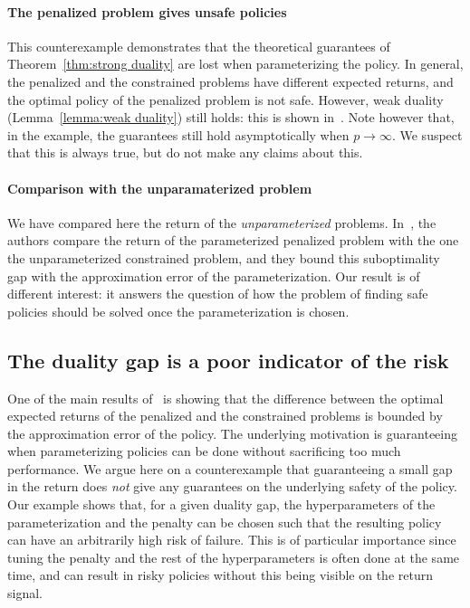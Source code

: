 \paragraph{The penalized problem gives unsafe policies} This counterexample demonstrates that the theoretical guarantees of Theorem~\ref{thm:strong duality} are lost when parameterizing the policy. In general, the penalized and the constrained problems have different expected returns, and the optimal policy of the penalized problem is not safe. However, weak duality (Lemma~\ref{lemma:weak duality}) still holds: this is shown in~\cite{paternain2019safe}. Note however that, in the example, the guarantees still hold asymptotically when $p\to\infty$. We suspect that this is always true, but do not make any claims about this.

\paragraph{Comparison with the unparamaterized problem} We have compared here the return of the\emph{ unparameterized} problems. In~\cite{paternain2019safe}, the authors compare the return of the parameterized penalized problem with the one the unparameterized constrained problem, and they bound this suboptimality gap with the approximation error of the parameterization. Our result is of different interest: it answers the question of how the problem of finding safe policies should be solved once the parameterization is chosen.

\subsection{The duality gap is a poor indicator of the risk} \label{sec:value unreliable}
One of the main results of~\cite{paternain2019safe} is showing that the difference between the optimal expected returns of the penalized and the constrained problems is bounded by the approximation error of the policy. The underlying motivation is guaranteeing when parameterizing policies can be done without sacrificing too much performance. We argue here on a counterexample that guaranteeing a small gap in the return does\emph{ not} give any guarantees on the underlying safety of the policy. Our example shows that, for a given duality gap, the hyperparameters of the parameterization and the penalty can be chosen such that the resulting policy can have an arbitrarily high risk of failure. This is of particular importance since tuning the penalty and the rest of the hyperparameters is often done at the same time, and can result in risky policies without this being visible on the return signal.

